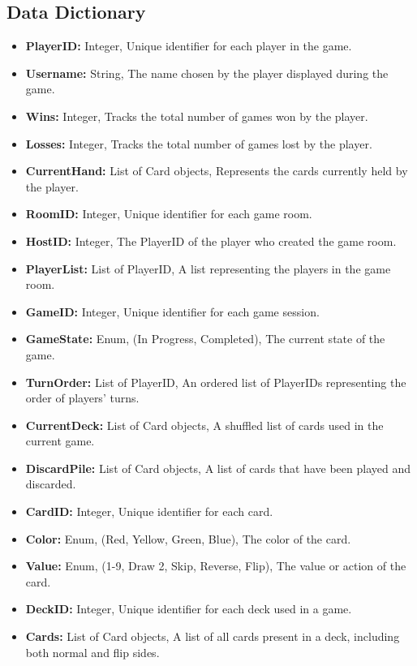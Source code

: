 \documentclass{article}
\begin{document}
\subsection{Data Dictionary}
\begin{itemize}
    \item \textbf{PlayerID:} Integer, Unique identifier for each player in the game.
    \item \textbf{Username:} String, The name chosen by the player displayed during the game.
    \item \textbf{Wins:} Integer, Tracks the total number of games won by the player.
    \item \textbf{Losses:} Integer, Tracks the total number of games lost by the player.
    \item \textbf{CurrentHand:} List of Card objects, Represents the cards currently held by the player.
    \item \textbf{RoomID:} Integer, Unique identifier for each game room.
    \item \textbf{HostID:} Integer, The PlayerID of the player who created the game room.
    \item \textbf{PlayerList:} List of PlayerID, A list representing the players in the game room.
    \item \textbf{GameID:} Integer, Unique identifier for each game session.
    \item \textbf{GameState:} Enum, (In Progress, Completed), The current state of the game.
    \item \textbf{TurnOrder:} List of PlayerID, An ordered list of PlayerIDs representing the order of players’ turns.
    \item \textbf{CurrentDeck:} List of Card objects, A shuffled list of cards used in the current game.
    \item \textbf{DiscardPile:} List of Card objects, A list of cards that have been played and discarded.
    \item \textbf{CardID:} Integer, Unique identifier for each card.
    \item \textbf{Color:} Enum, (Red, Yellow, Green, Blue), The color of the card.
    \item \textbf{Value:} Enum, (1-9, Draw 2, Skip, Reverse, Flip), The value or action of the card.
    \item \textbf{DeckID:} Integer, Unique identifier for each deck used in a game.
    \item \textbf{Cards:} List of Card objects, A list of all cards present in a deck, including both normal and flip sides.
\end{itemize}
\end{document}
